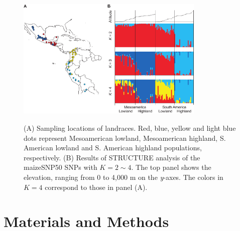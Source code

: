 
\begin{figure}[tb]   
  \begin{center}
   \vspace{-0mm}
   \includegraphics[width=0.8\textwidth]{fig/Fig2}
   \renewcommand{\baselinestretch}{0.9}
   \vspace{-3mm}
   \caption{
   (A) Sampling locations of landraces.  Red, blue, yellow and light blue dots represent Mesoamerican lowland, Mesoamerican highland, S. American lowland and S. American highland populations, respectively.  
   (B) Results of {\sf STRUCTURE} analysis of the maizeSNP50 SNPs with $K=2\sim4$.  The top panel shows the elevation, ranging from 0 to 4,000 m on the \emph{y}-axes.  The colors in $K=4$ correspond to those in panel (A).    }
\vspace{-6mm}
    \label{map}
  \end{center}
\end{figure}

\section*{Materials and Methods}

